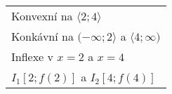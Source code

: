 \begin{center}
  \begin{tabular}{l}
    Konvexní na $\langle2;4\rangle$\\
    Konkávní na $(-\infty;2\rangle$ a $\langle4;\infty)$\\
    Inflexe v $x=2$ a $x=4$\\
    $I_1[2;f(2)]$ a $I_2[4;f(4)]$
  \end{tabular}
\end{center}

\begin{center}
\end{center}

